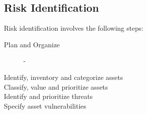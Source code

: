 \documentclass[12pt letter]{report}
\begin{document}
\subsection{Risk Identification}

Risk identification involves the following steps:
\begin{description}
  \item[Plan and Organize] -
  \item[Identify, inventory and categorize assets]
  \item[Classify, value and prioritize assets]
  \item[Identify and prioritize threats]
  \item[Specify asset vulnerabilities]
\end{description}
\end{document}
